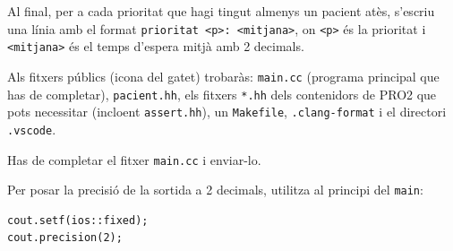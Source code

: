 Al final, per a cada prioritat que hagi tingut almenys un pacient
atès, s'escriu una línia amb el format 
\verb|prioritat <p>: <mitjana>|, on \verb|<p>| és la prioritat i 
\verb|<mitjana>| és el temps d'espera mitjà amb 2 decimals.

\Observation

Als fitxers públics (icona del gatet) trobaràs: \verb|main.cc|
(programa principal que has de completar), \verb|pacient.hh|, els
fitxers \verb|*.hh| dels contenidors de PRO2 que pots necessitar
(incloent \verb|assert.hh|), un \verb|Makefile|,
\verb|.clang-format| i el directori \verb|.vscode|.

\medskip

Has de completar el fitxer \verb|main.cc| i enviar-lo.

\medskip

Per posar la precisió de la sortida a 2 decimals, utilitza al
principi del \verb|main|:

\begin{verbatim}
cout.setf(ios::fixed);
cout.precision(2);
\end{verbatim}

\SampleTwoCol
